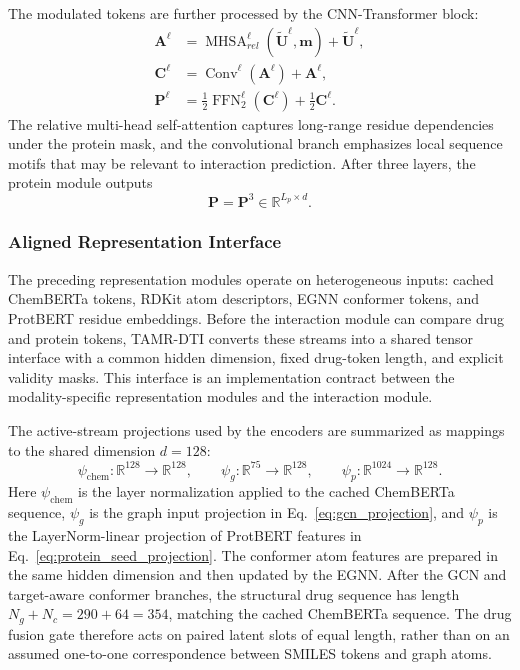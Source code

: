 The modulated tokens are further processed by the CNN-Transformer block:
\begin{equation}
\begin{aligned}
  \mathbf{A}^{\ell}
  &=
  \operatorname{MHSA}_{rel}^{\ell}
  (\tilde{\mathbf{U}}^{\ell},\mathbf{m})
  +\tilde{\mathbf{U}}^{\ell},\\
  \mathbf{C}^{\ell}
  &=
  \operatorname{Conv}^{\ell}(\mathbf{A}^{\ell})
  +\mathbf{A}^{\ell},\\
  \mathbf{P}^{\ell}
  &=
  \frac{1}{2}\operatorname{FFN}^{\ell}_{2}(\mathbf{C}^{\ell})
  +
  \frac{1}{2}\mathbf{C}^{\ell}.
\end{aligned}
\label{eq:protein_acmix}
\end{equation}
The relative multi-head self-attention captures long-range residue dependencies
under the protein mask, and the convolutional branch emphasizes local sequence
motifs that may be relevant to interaction prediction. After three layers, the
protein module outputs
\begin{equation}
  \mathbf{P}=\mathbf{P}^{3}
  \in\mathbb{R}^{L_p\times d}.
  \label{eq:protein_output}
\end{equation}

\subsubsection{Aligned Representation Interface}
\label{sec:feature_encoder_module}

The preceding representation modules operate on heterogeneous inputs: cached
ChemBERTa tokens, RDKit atom descriptors, EGNN conformer tokens, and ProtBERT
residue embeddings. Before the interaction module can compare drug and protein
tokens, TAMR-DTI converts these streams into a shared tensor interface with a
common hidden dimension, fixed drug-token length, and explicit validity masks.
This interface is an implementation contract between the modality-specific
representation modules and the interaction module.

The active-stream projections used by the encoders are summarized as mappings to
the shared dimension $d=128$:
\begin{equation}
  \psi_{\mathrm{chem}}:\mathbb{R}^{128}\rightarrow\mathbb{R}^{128},\qquad
  \psi_{g}:\mathbb{R}^{75}\rightarrow\mathbb{R}^{128},\qquad
  \psi_{p}:\mathbb{R}^{1024}\rightarrow\mathbb{R}^{128}.
  \label{eq:feature_projection}
\end{equation}
Here $\psi_{\mathrm{chem}}$ is the layer normalization applied to the cached ChemBERTa
sequence, $\psi_g$ is the graph input projection in
Eq.~\ref{eq:gcn_projection}, and $\psi_p$ is the LayerNorm-linear projection of
ProtBERT features in Eq.~\ref{eq:protein_seed_projection}. The conformer atom
features are prepared in the same hidden dimension and then updated by the EGNN.
After the GCN and target-aware conformer branches, the structural drug sequence
has length $N_g+N_c=290+64=354$, matching the cached ChemBERTa sequence. The
drug fusion gate therefore acts on paired latent slots of equal length, rather
than on an assumed one-to-one correspondence between SMILES tokens and graph
atoms.

